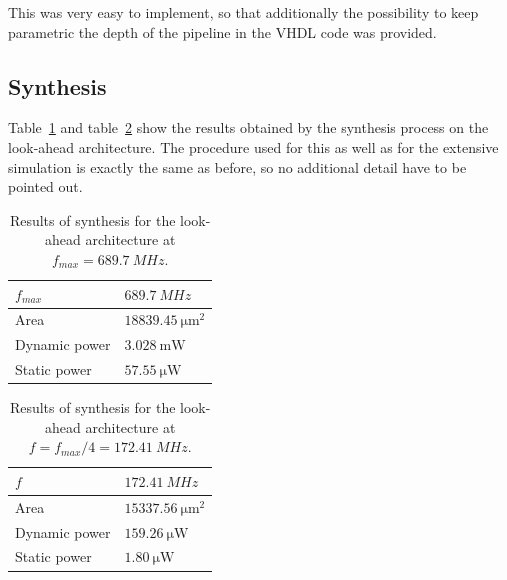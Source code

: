\documentclass[a4paper]{article}
\begin{document}
This was very easy to implement, so that additionally the possibility to keep parametric the depth of the pipeline in the VHDL code was provided.

\subsection{Synthesis}
Table~\ref{tab:lookahead_post_syn_fmax} and table~\ref{tab:lookahead_post_syn} show the results obtained by the synthesis process on the look-ahead architecture. The procedure used for this as well as for the extensive simulation is exactly the same as before, so no additional detail have to be pointed out. 


\begin{table}[hbtp]
    \centering
    \begin{tabular}{l|l|}
    \hline
    \multicolumn{1}{|l|}{$f_{max}$}     & $\SI{689.7}{MHz}$                 \\ \hline
    \multicolumn{1}{|l|}{Area}          & $\SI{18839.45}{\micro\meter^2}$   \\ \hline
    \multicolumn{1}{|l|}{Dynamic power} & $\SI{3.028}{\milli\watt}$         \\ \hline
    \multicolumn{1}{|l|}{Static power}  & $\SI{57.55}{\micro\watt}$         \\ \hline
    \end{tabular}
    \caption{Results of synthesis for the look-ahead architecture at $f_{max} = \SI{689.7}{MHz}$.}
    \label{tab:lookahead_post_syn_fmax}
\end{table}

\begin{table}[hbtp]
    \centering
    \begin{tabular}{l|l|}
    \hline
    \multicolumn{1}{|l|}{$f$}           & $\SI{172.41}{MHz}$                \\ \hline
    \multicolumn{1}{|l|}{Area}          & $\SI{15337.56}{\micro\meter^2}$   \\ \hline
    \multicolumn{1}{|l|}{Dynamic power} & $\SI{159.26}{\micro\watt}$        \\ \hline
    \multicolumn{1}{|l|}{Static power}  & $\SI{1.80}{\micro\watt}$          \\ \hline
    \end{tabular}
    \caption{Results of synthesis for the look-ahead architecture at $f = f_{max}/4 = \SI{172.41}{MHz}$.}
    \label{tab:lookahead_post_syn}
\end{table}
\end{document}
